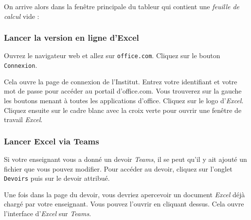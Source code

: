 On arrive alors dans la fenêtre principale du tableur qui contient une \emph{feuille de calcul} vide :


\subsubsection{Lancer la version en ligne d'Excel}

Ouvrez le navigateur web et allez sur \texttt{office.com}. Cliquez sur le bouton \texttt{Connexion}.


Cela ouvre la page de connexion de l'Institut. Entrez votre identifiant et votre mot de passe pour accéder au portail d'office.com. Vous trouverez sur la gauche les boutons menant à toutes les applications d'office. Cliquez sur le logo d'\emph{Excel}. Cliquez ensuite sur le cadre blanc avec la croix verte pour ouvrir une fenêtre de travail \emph{Excel}.


\subsubsection{Lancer Excel via Teams}

Si votre enseignant vous a donné un devoir \emph{Teams}, il se peut qu'il y ait ajouté un fichier que vous pouvez modifier. Pour accéder au devoir, cliquez sur l'onglet \texttt{Devoirs}  puis sur le devoir attribué. 


Une fois dans la page du devoir, vous devriez apercevoir un document \emph{Excel} déjà chargé par votre enseignant. Vous pouvez l'ouvrir en cliquant dessus. Cela ouvre l'interface d'\emph{Excel} sur \emph{Teams}.



